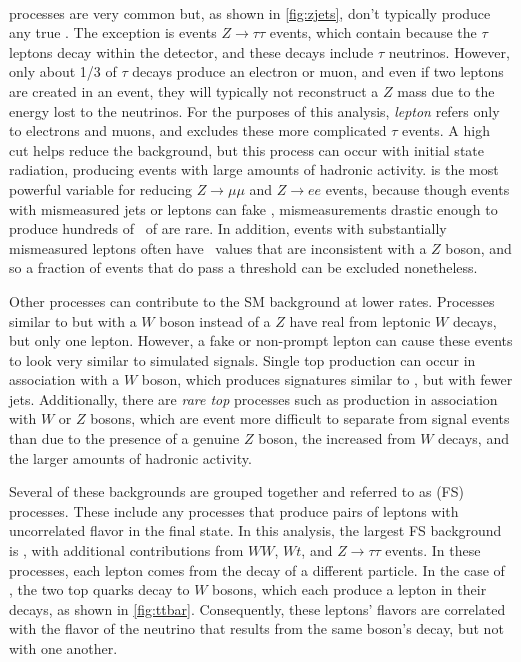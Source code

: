\paragraph{\dyjets} processes are very common but, as shown in \autoref{fig:zjets}, don't typically produce any true \MET. The exception is events $Z\rightarrow\tau\tau$ events, which contain \MET because the $\tau$ leptons decay within the detector, and these decays include $\tau$ neutrinos. However, only about 1/3 of $\tau$ decays produce an electron or muon, and even if two leptons are created in an event, they will typically not reconstruct a $Z$ mass due to the energy lost to the neutrinos. For the purposes of this analysis, \textit{lepton} refers only to electrons and muons, and excludes these more complicated $\tau$ events. A high \HT cut helps reduce the \dyjets background, but this process can occur with initial state radiation, producing events with large amounts of hadronic activity. \MET is the most powerful variable for reducing $Z\rightarrow\mu\mu$ and $Z\rightarrow ee$ events, because though events with mismeasured jets or leptons can fake \MET, mismeasurements drastic enough to produce hundreds of \gev~of \met are rare. In addition, events with substantially mismeasured leptons often have \mll~values that are inconsistent with a $Z$ boson, and so a fraction of \dyjets events that do pass a \MET threshold can be excluded nonetheless. 

Other processes can contribute to the \ac{SM} background at lower rates. Processes similar to \dyjets but with a $W$ boson instead of a $Z$ have real \MET from leptonic $W$ decays, but only one lepton. However, a fake or non-prompt lepton can cause these events to look very similar to simulated signals. Single top production can occur in association with a $W$ boson, which produces signatures similar to \ttbar, but with fewer jets.  Additionally, there are \textit{rare top} processes such as \ttbar production in association with $W$ or $Z$ bosons, which are event more difficult to separate from signal events than \ttbar due to the presence of a genuine $Z$ boson, the increased \met from $W$ decays, and the larger amounts of hadronic activity.

Several of these backgrounds are grouped together and referred to as \textit{} (\acs{FS}) processes. These include any processes that produce pairs of leptons with uncorrelated flavor in the final state. In this analysis, the largest \ac{FS} background is \ttbar, with additional contributions from $WW$, $Wt$, and $Z\rightarrow\tau\tau$ events. In these processes, each lepton comes from the decay of a different particle. In the case of \ttbar, the two top quarks decay to $W$ bosons, which each produce a lepton in their decays, as shown in \autoref{fig:ttbar}. Consequently, these leptons' flavors are correlated with the flavor of the neutrino that results from the same boson's decay, but not with one another.

